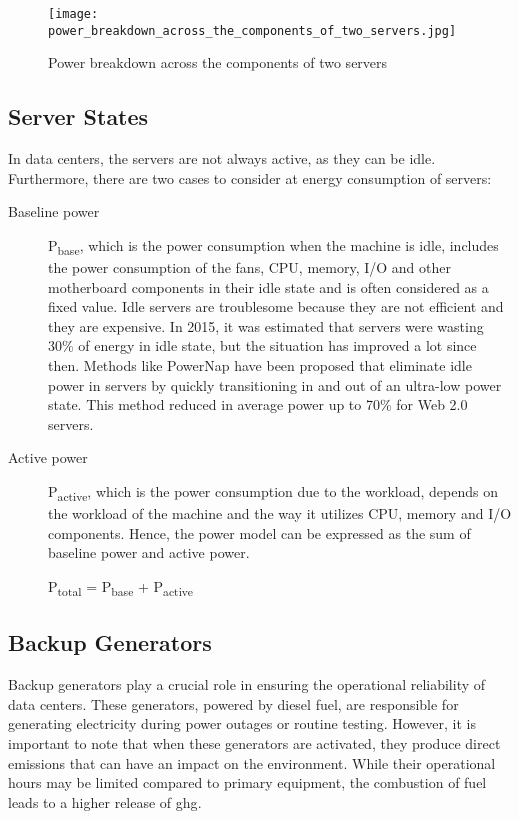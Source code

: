 \documentclass[
  a4paper,  %
  twoside,  %
  bibliography=totoc,
  headsepline,
  cleardoublepage=empty,
  parskip=half,
  draft=false
]{scrbook}
\begin{document}
\begin{figure}
	\centering
	\texttt{[image: power\_breakdown\_across\_the\_components\_of\_two\_servers.jpg]}
	\caption{Power breakdown across the components of two servers\cite{dayarathna2015data}}
	\label{servers_comparison}
\end{figure}



\subsection{Server States}
In data centers, the servers are not always active, as they can be idle. Furthermore, there are two cases to consider at energy consumption of servers:

\begin{description}
	\item[Baseline power] P\textsubscript{base}, which is the power consumption when the machine is idle, includes the power consumption of the fans, CPU, memory, I/O and other motherboard components in their idle state and is often considered as a fixed value. Idle servers are troublesome because they are not efficient and they are expensive\cite{raritanIdleServer}. In 2015, it was estimated that servers were wasting 30\% of energy in idle state, but the situation has improved a lot since then\cite{computerweeklyWasteEnergy}\cite{basmadjian2012modelling}. Methods like PowerNap have been proposed\cite{powernap_server} that eliminate idle power in servers by quickly transitioning in and out of an ultra-low power state. This method reduced in average power up to 70\% for Web 2.0 servers.
	
	\item[Active power] P\textsubscript{active}, which is the power consumption due to the workload, depends on the workload of the machine and the way it utilizes CPU, memory and I/O components. Hence, the power model can be expressed as the sum of baseline power and active power\cite{JIN2020114806}. 
	
	\begin{center}
		P\textsubscript{total} = P\textsubscript{base} + P\textsubscript{active}
	\end{center}
\end{description}


\subsection{Backup Generators}
Backup generators play a crucial role in ensuring the operational reliability of data centers. These generators, powered by diesel fuel, are responsible for generating electricity during power outages or routine testing. However, it is important to note that when these generators are activated, they produce direct emissions that can have an impact on the environment. While their operational hours may be limited compared to primary equipment, the combustion of fuel leads to a higher release of \gls{ghg}\cite{jiang2015energy}.
\end{document}
